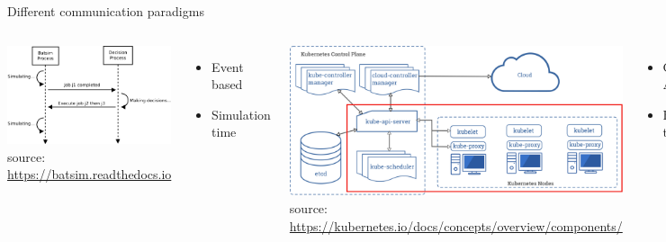 \documentclass[12pt, aspectratio=43]{beamer}
\begin{document}
\begin{frame}{Different communication paradigms}
	\begin{columns}
		\centering
		\includegraphics[width=\textwidth]{../imgs/case1_protocol.png}
		{\tiny source: \url{https://batsim.readthedocs.io}}
		\begin{itemize}
			\item Event based
			\item Simulation time
		\end{itemize}

		\includegraphics[width=\textwidth]{../imgs/kubernetes-components.pdf}
		{\tiny source: \url{https://kubernetes.io/docs/concepts/overview/components/}}
		\begin{itemize}
			\item Central API
			\item Real time
		\end{itemize}
	\end{columns}
\end{frame}
\end{document}
